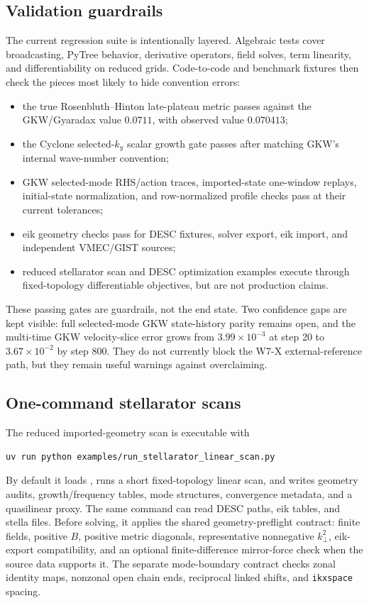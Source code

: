 \documentclass[11pt,a4paper]{article}
\begin{document}
\subsection{Validation guardrails}

The current regression suite is intentionally layered.  Algebraic tests cover
broadcasting, PyTree behavior, derivative operators, field solves, term
linearity, and differentiability on reduced grids.  Code-to-code and benchmark
fixtures then check the pieces most likely to hide convention errors:
\begin{itemize}
  \item the true Rosenbluth--Hinton late-plateau metric passes against the
  GKW/Gyaradax value \(0.0711\), with observed value \(0.070413\);
  \item the Cyclone selected-\(k_y\) scalar growth gate passes after matching
  GKW's internal wave-number convention;
  \item GKW selected-mode RHS/action traces, imported-state one-window replays,
  initial-state normalization, and row-normalized 
  profile checks pass at their current tolerances;
  \item eik geometry checks pass for DESC fixtures, solver export, eik
  import, and independent VMEC/GIST sources;
  \item reduced stellarator scan and DESC optimization examples execute through
  fixed-topology differentiable objectives, but are not production claims.
\end{itemize}

These passing gates are guardrails, not the end state.  Two confidence gaps are
kept visible: full selected-mode GKW state-history parity remains open, and the
multi-time GKW velocity-slice error grows from \(3.99\times10^{-3}\) at step 20
to \(3.67\times10^{-2}\) by step 800.  They do not currently block the W7-X
external-reference path, but they remain useful warnings against overclaiming.

\subsection{One-command stellarator scans}

The reduced imported-geometry scan is executable with
\begin{verbatim}
uv run python examples/run_stellarator_linear_scan.py
\end{verbatim}
By default it loads , runs
a short fixed-topology linear scan, and writes geometry audits, growth/frequency
tables, mode structures, convergence metadata, and a quasilinear proxy.  The
same command can read DESC paths, eik tables, and stella 
files.  Before solving, it applies the shared geometry-preflight contract:
finite fields, positive \(B\), positive metric diagonals, representative
nonnegative \(k_\perp^2\), eik-export compatibility, and an optional
finite-difference mirror-force check when the source data supports it.  The
separate mode-boundary contract checks zonal identity maps, nonzonal open chain
ends, reciprocal linked shifts, and \texttt{ikxspace} spacing.
\end{document}
